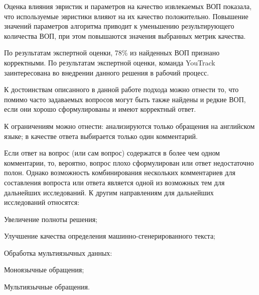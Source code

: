 Оценка влияния эвристик и параметров на качество извлекаемых ВОП показала, что используемые эвристики влияют на их качество положительно. Повышение значений параметров алгоритма приводит к уменьшению результирующего количества ВОП, при этом повышаются значения выбранных метрик качества.

По результатам экспертной оценки, 78\% из найденных ВОП признано корректными. По результатам экспертной оценки, команда YouTrack заинтересована во внедрении данного решения в рабочий процесс.

К достоинствам описанного в данной работе подхода можно отнести то, что помимо часто задаваемых вопросов могут быть также найдены и редкие ВОП, если они хорошо сформулированы и имеют корректный ответ.

К ограничениям можно отнести: анализируются только обращения на английском языке; в качестве ответа выбирается только один комментарий. 

Если ответ на вопрос (или сам вопрос) содержатся в более чем одном комментарии, то, вероятно, вопрос плохо сформулирован или ответ недостаточно полон. Однако возможность комбинирования нескольких комментариев для составления вопроста или ответа является одной из возможных тем для дальнейших исследований. К другим направлениям для дальнейших исследований относятся:

\begin{itemize*}
\item Увеличение полноты решения;
\item Улучшение качества определения машинно-сгенерированного текста;
\item Обработка мультиязычных данных: 
\begin{itemize*}
\item Моноязычные обращения; 
\item Мультиязычные обращения.
\end{itemize*}
\end{itemize*}
